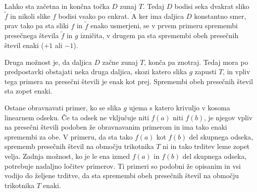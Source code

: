 \documentclass[mat1]{fmfdelo}
\begin{document}
Lahko sta začetna in končna točka $D$ zunaj $T$. Tedaj $D$ bodisi seka dvakrat sliko $\widetilde{f}$ in nikoli slike $f$ bodisi vsako po enkrat. A ker ima daljica $D$ konstantno smer, prav tako pa sta sliki $f$ in $\widetilde{f}$ enako usmerjeni, se v prvem primeru spremembi presečnega števila $\widetilde{f}$ in $g$ izničita, v drugem pa sta spremembi obeh presečnih števil enaki ($+1$ ali $-1$).

Druga možnost je, da daljica $D$ začne zunaj $T$, konča pa znotraj. Tedaj mora po predpostavki obstajati neka druga daljica, skozi katero slika $g$ zapusti $T$, in vpliv tega primera na presečni števili je enak kot prej. Spremembi obeh presečnih števil sta zopet enaki.


\begin{center}
\end{center}


Ostane obravnavati primer, ko se slika $g$ ujema s katero krivuljo v kosoma linearnem odseku. Če ta odsek ne vključuje niti $f(a)$ niti $f(b)$, je njegov vpliv na presečni števili podoben že obravnavanim primerom in ima tako enaki spremembi za obe. V primeru, da sta tako $f(a)$ kot $f(b)$ del skupnega odseka, sprememb presečnih števil na območju trikotnika $T$ ni in tako trditev leme zopet velja. Zadnja možnost, ko je le ena izmed $f(a)$ in $f(b)$ del skupnega odseka, potrebuje nadaljno ločitev primerov. Ti primeri so podobni že opisanim in vsi vodijo do željene trditve, da sta spremembi obeh presečnih števil na območju trikotnika $T$ enaki.
\endproof
\end{document}
